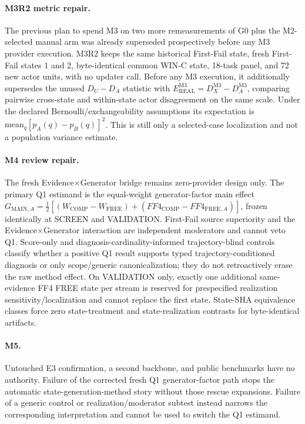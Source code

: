 \paragraph{M3R2 metric repair.}
The previous plan to spend M3 on two more remeasurements of G0 plus the M2-selected manual arm was already superseded prospectively before any M3 provider execution. M3R2 keeps the same historical First-Fail state, fresh First-Fail states 1 and 2, byte-identical common WIN-C state, 18-task panel, and 72 new actor units, with no updater call. Before any M3 execution, it additionally supersedes the unused $D_U-D_A$ statistic with $E_{\mathrm{REAL}}^{\mathrm{M3}}=D_X^{\mathrm{M3}}-D_A^{\mathrm{M3}}$, comparing pairwise cross-state and within-state actor disagreement on the same scale. Under the declared Bernoulli/exchangeability assumptions its expectation is $\mathrm{mean}_q[p_A(q)-p_B(q)]^2$. This is still only a selected-case localization and not a population variance estimate.

\paragraph{M4 review repair.}
The fresh Evidence$\times$Generator bridge remains zero-provider design only. The primary Q1 estimand is the equal-weight generator-factor main effect $G_{\mathrm{MAIN},A}=\frac12[(W_{\mathrm{COMP}}-W_{\mathrm{FREE}})+(FF4_{\mathrm{COMP}}-FF4_{\mathrm{FREE},A})]$, frozen identically at SCREEN and VALIDATION. First-Fail source superiority and the Evidence$\times$Generator interaction are independent moderators and cannot veto Q1. Score-only and diagnosis-cardinality-informed trajectory-blind controls classify whether a positive Q1 result supports typed trajectory-conditioned diagnosis or only scope/generic canonicalization; they do not retroactively erase the raw method effect. On VALIDATION only, exactly one additional same-evidence FF4 FREE state per stream is reserved for prespecified realization sensitivity/localization and cannot replace the first state. State-SHA equivalence classes force zero state-treatment and state-realization contrasts for byte-identical artifacts.

\paragraph{M5.}
Untouched E3 confirmation, a second backbone, and public benchmarks have no authority. Failure of the corrected fresh Q1 generator-factor path stops the automatic state-generation-method story without those rescue expansions. Failure of a generic control or realization/moderator subtest instead narrows the corresponding interpretation and cannot be used to switch the Q1 estimand.

